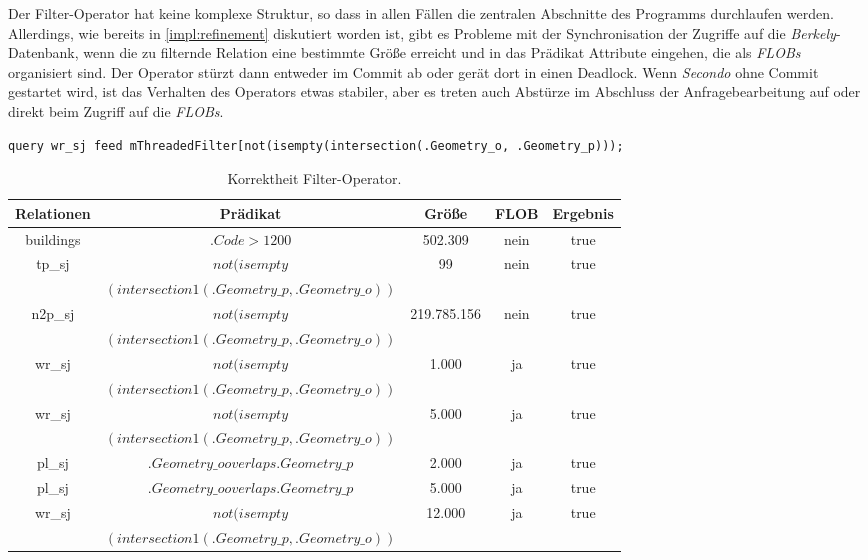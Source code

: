 \documentclass[a4paper,12pt,twoside]{article}
\newcommand{\Fb}[1]{\textit{#1}} %
\begin{document}
Der Filter-Operator hat keine komplexe Struktur, so dass in allen Fällen die zentralen Abschnitte des Programms durchlaufen werden. Allerdings, wie bereits in \autoref{impl:refinement} diskutiert worden ist, gibt es Probleme mit der Synchronisation der Zugriffe auf die \Fb{Berkely}-Datenbank, wenn die zu filternde Relation eine bestimmte Größe erreicht und in das Prädikat Attribute eingehen, die als \Fb{FLOBs} organisiert sind. Der Operator stürzt dann entweder im Commit ab oder gerät dort in einen Deadlock. Wenn \Fb{Secondo} ohne Commit gestartet wird, ist das Verhalten des Operators etwas stabiler, aber es treten auch Abstürze im Abschluss der Anfragebearbeitung auf oder direkt beim Zugriff auf die \Fb{FLOBs}.

\begin{minipage}{0.95\textwidth}
	\begin{lstlisting}[caption={Testquery für den Filter-Operator, die auf Schnittpunkte zwischen Straßen und Wasserwegen prüft.}, label=list:testfilter]
	query wr_sj feed mThreadedFilter[not(isempty(intersection(.Geometry_o, .Geometry_p)));
	\end{lstlisting}
\end{minipage}

\begin{table}
	\centering
	\begin{tabular}{|c|c|c|c|c|}
		\hline
		\rowcolor{gray!30}
		Relationen & Prädikat & Größe & FLOB & Ergebnis \\ 
		\hline 
		buildings & $.Code > 1200$ & 502.309 & nein & true \\ 
		\hline 
		tp\_sj\footnotemark & $not(isempty$ & 99 & nein & true \\
		 & $(intersection1(.Geometry\_p, .Geometry\_o))$ &  &  &  \\ 
		\hline
		n2p\_sj\footnotemark & $not(isempty$ & 219.785.156
		 & nein & true \\
		& $(intersection1(.Geometry\_p, .Geometry\_o))$ &  &  &  \\ 
		\hline
		wr\_sj\footnotemark & $not(isempty$ & 1.000 & ja & true \\ 
		 & $(intersection1(.Geometry\_p, .Geometry\_o))$ &  &  &  \\ 
		\hline
		wr\_sj  & $not(isempty$ & 5.000 & ja & true \\
		 & $(intersection1(.Geometry\_p, .Geometry\_o))$ &  &  &  \\  
		\hline
		pl\_sj\footnotemark & $.Geometry\_o overlaps .Geometry\_p$ & 2.000 & ja & true \\ 
		\hline
		pl\_sj  & $.Geometry\_o overlaps .Geometry\_p$ & 5.000 & ja & true \\ 
		\hline
		wr\_sj  & $not(isempty$ & 12.000 & ja & true \\
		 & $(intersection1(.Geometry\_p, .Geometry\_o))$ &  &  &  \\  
		\hline
	\end{tabular}
	\caption{\label{tab:testFilter}Korrektheit Filter-Operator.}
\end{table}
\end{document}
